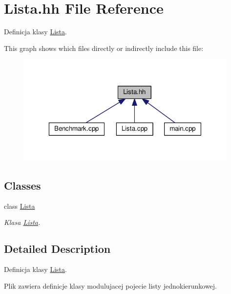 \hypertarget{a00013}{}\section{Lista.\+hh File Reference}
\label{a00013}


Definicja klasy \hyperlink{a00004}{Lista}.  


This graph shows which files directly or indirectly include this file\+:\nopagebreak
\begin{figure}[H]
\begin{center}
\leavevmode
\includegraphics[width=313pt]{a00027}
\end{center}
\end{figure}
\subsection*{Classes}
\begin{DoxyCompactItemize}
\item 
class \hyperlink{a00004}{Lista}
\begin{DoxyCompactList}\small\item\em Klasa \hyperlink{a00004}{Lista}. \end{DoxyCompactList}\end{DoxyCompactItemize}


\subsection{Detailed Description}
Definicja klasy \hyperlink{a00004}{Lista}. 

Plik zawiera definicje klasy modulujacej pojecie listy jednokierunkowej. 